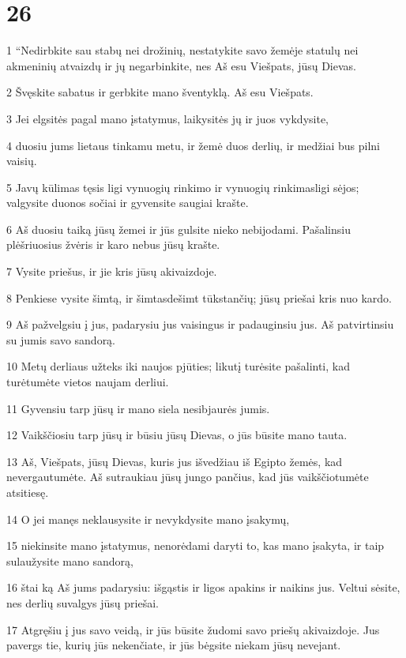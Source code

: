 \chapter{26}

\par 1 “Nedirbkite sau stabų nei drožinių, nestatykite savo žemėje statulų nei akmeninių atvaizdų ir jų negarbinkite, nes Aš esu Viešpats, jūsų Dievas. 
\par 2 Švęskite sabatus ir gerbkite mano šventyklą. Aš esu Viešpats. 
\par 3 Jei elgsitės pagal mano įstatymus, laikysitės jų ir juos vykdysite, 
\par 4 duosiu jums lietaus tinkamu metu, ir žemė duos derlių, ir medžiai bus pilni vaisių. 
\par 5 Javų kūlimas tęsis ligi vynuogių rinkimo ir vynuogių rinkimas­ligi sėjos; valgysite duonos sočiai ir gyvensite saugiai krašte. 
\par 6 Aš duosiu taiką jūsų žemei ir jūs gulsite nieko nebijodami. Pašalinsiu plėšriuosius žvėris ir karo nebus jūsų krašte. 
\par 7 Vysite priešus, ir jie kris jūsų akivaizdoje. 
\par 8 Penkiese vysite šimtą, ir šimtas­dešimt tūkstančių; jūsų priešai kris nuo kardo. 
\par 9 Aš pažvelgsiu į jus, padarysiu jus vaisingus ir padauginsiu jus. Aš patvirtinsiu su jumis savo sandorą. 
\par 10 Metų derliaus užteks iki naujos pjūties; likutį turėsite pašalinti, kad turėtumėte vietos naujam derliui. 
\par 11 Gyvensiu tarp jūsų ir mano siela nesibjaurės jumis. 
\par 12 Vaikščiosiu tarp jūsų ir būsiu jūsų Dievas, o jūs būsite mano tauta. 
\par 13 Aš, Viešpats, jūsų Dievas, kuris jus išvedžiau iš Egipto žemės, kad nevergautumėte. Aš sutraukiau jūsų jungo pančius, kad jūs vaikščiotumėte atsitiesę. 
\par 14 O jei manęs neklausysite ir nevykdysite mano įsakymų, 
\par 15 niekinsite mano įstatymus, nenorėdami daryti to, kas mano įsakyta, ir taip sulaužysite mano sandorą, 
\par 16 štai ką Aš jums padarysiu: išgąstis ir ligos apakins ir naikins jus. Veltui sėsite, nes derlių suvalgys jūsų priešai. 
\par 17 Atgręšiu į jus savo veidą, ir jūs būsite žudomi savo priešų akivaizdoje. Jus pavergs tie, kurių jūs nekenčiate, ir jūs bėgsite niekam jūsų nevejant. 
